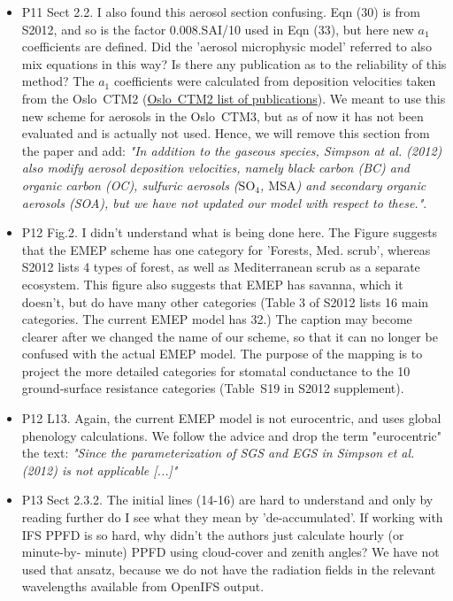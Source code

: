 \documentclass{scrartcl}
\begin{document}
\begin{itemize}
\item {\color{blue}P11 Sect 2.2. I also found this aerosol section confusing. Eqn (30) is from S2012,
and so is the factor 0.008.SAI/10 used in Eqn (33), but here new $a_1$ coefficients
are defined. Did the ’aerosol microphysic model’ referred to also mix equations
in this way? Is there any publication as to the reliability of this method?}
  The $a_1$ coefficients were calculated from deposition velocities taken from the Oslo~CTM2 (\href{http://folk.uio.no/mariantl/osloctm3/history.html}{Oslo~CTM2 list of publications}). We meant to use this new scheme for aerosols in the Oslo~CTM3, but as of now it has not been evaluated and is actually not used. Hence, we will remove this section from the paper and add: \emph{"In addition to the gaseous species, Simpson at al. (2012) also modify aerosol deposition velocities, namely black carbon (BC) and organic carbon (OC), sulfuric aerosols ($\mathrm{SO_4}$, $\mathrm{MSA}$) and secondary organic aerosols (SOA), but we have not updated our model with respect to these."}.
  
\item {\color{blue}P12 Fig.2. I didn’t understand what is being done here. The Figure suggests that
the EMEP scheme has one category for ’Forests, Med. scrub’, whereas S2012
lists 4 types of forest, as well as Mediterranean scrub as a separate ecosystem.
This figure also suggests that EMEP has savanna, which it doesn’t, but do have
many other categories (Table 3 of S2012 lists 16 main categories. The current
EMEP model has 32.)}
  The caption may become clearer after we changed the name of our scheme, so that it can no longer be confused with the actual EMEP model. The purpose of the mapping is to project the more detailed categories for stomatal conductance to the 10 ground-surface resistance categories (Table~S19 in S2012 supplement).
  
\item {\color{blue}P12 L13. Again, the current EMEP model is not eurocentric, and uses global
  phenology calculations.}
  We follow the advice and drop the term "eurocentric" the text: \emph{"Since the parameterization of SGS and EGS in Simpson et al. (2012) is not applicable [...]"}
  
\item {\color{blue}P13 Sect 2.3.2. The initial lines (14-16) are hard to understand and only by
reading further do I see what they mean by ’de-accumulated’. If working with
IFS PPFD is so hard, why didn’t the authors just calculate hourly (or minute-by-
minute) PPFD using cloud-cover and zenith angles?}
We have not used that ansatz, because we do not have the radiation fields in the relevant wavelengths available from OpenIFS output.
\end{itemize}
\newpage
\end{document}
